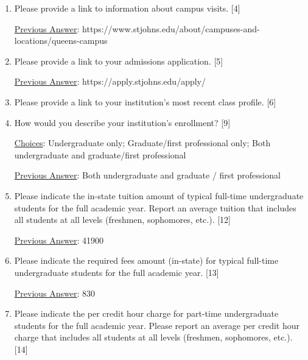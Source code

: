 \documentclass[12 pt, a4paper]{article}
\begin{document}
\begin{Form}
\begin{enumerate}
\TextField[width = 6 in,multiline, name=90006]{} \medskip

\item Please provide a link to information about campus visits. [4] \medskip

\underline{Previous Answer}: https://www.stjohns.edu/about/campuses-and-locations/queens-campus\medskip

\TextField[width = 6 in,multiline, name=90007]{} \medskip

\item Please provide a link to your admissions application. [5] \medskip

\underline{Previous Answer}: https://apply.stjohns.edu/apply/\medskip

\TextField[width = 6 in,multiline, name=90008]{} \medskip

\item Please provide a link to your institution's most recent class profile. [6] \medskip

\TextField[width = 6 in,multiline, name=90009]{} \medskip

\item How would you describe your institution's enrollment? [9] \medskip

\underline{Choices}: Undergraduate only; Graduate/first professional only; Both undergraduate and graduate/first professional\medskip

\underline{Previous Answer}: Both undergraduate and graduate / first professional\medskip

\TextField[width = 6 in,multiline, name=90012]{} \medskip

\item Please indicate the in-state tuition amount of typical full-time undergraduate students for the full academic year. Report an average tuition that includes all students at all levels (freshmen, sophomores, etc.). [12] \medskip

\underline{Previous Answer}: 41900\medskip

\TextField[width = 6 in,multiline, name=90015]{} \medskip

\item Please indicate the required fees amount (in-state) for typical full-time undergraduate students for the full academic year. [13] \medskip

\underline{Previous Answer}: 830\medskip

\TextField[width = 6 in,multiline, name=90016]{} \medskip

\item Please indicate the per credit hour charge for part-time undergraduate students for the full academic year. Please report an average per credit hour charge that includes all students at all levels (freshmen, sophomores, etc.). [14] \medskip


\end{enumerate}
\end{Form}
\end{document}
